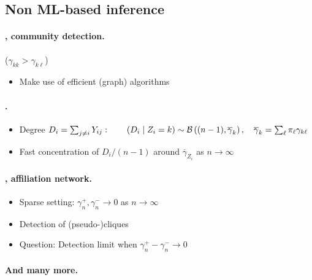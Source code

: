 \subsection{Non ML-based inference}

\jump \paragraph{\SBMo, community detection.} ($\gamma_{kk} > \gamma_{k\ell}$)
\begin{itemize}
\item Make use of efficient (graph) algorithms \citep{KaN11}
\end{itemize}

\jump \paragraph{\SBMo.} 
\begin{itemize}
\item Degree $D_i = \sum_{j \neq i} {Y_{ij}}: 
\qquad (D_i \mid Z_i=k) \sim \mathcal{B}\left((n-1), \overline{\gamma}_k\right), 
\quad \overline{\gamma}_k = \sum_\ell \pi_\ell \gamma_{k\ell}$
\item Fast concentration of $D_i/(n-1)$ around $\overline{\gamma}_{Z_i}$ as $n \rightarrow \infty$ \citep{CDR12}
\end{itemize}

\jump \paragraph{\SBMo, affiliation network.} 
\begin{itemize}
\item Sparse setting: $\gamma^+_n, \gamma^-_n \rightarrow 0$ as $n \rightarrow \infty$ 
\item Detection of (pseudo-)cliques \citep{ArV14}
\item Question: Detection limit when $\gamma^+_n - \gamma^-_n \rightarrow 0$
\end{itemize}

\jump \paragraph{And many more.} ~\\

